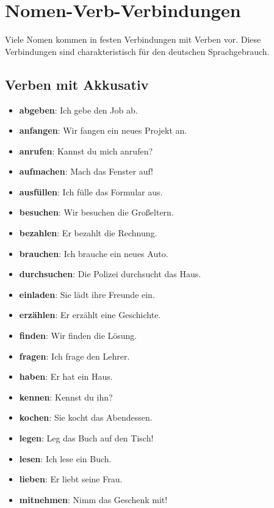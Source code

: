 \chapter{Nomen-Verb-Verbindungen}
\label{cha:NomenVerb}

Viele Nomen kommen in festen Verbindungen mit Verben vor. Diese Verbindungen sind charakteristisch für den deutschen Sprachgebrauch.

\section{Verben mit Akkusativ}
\label{sec:VerbenMitAkk}

\begin{itemize}
    \item \textbf{abgeben}: Ich gebe den Job ab.
    \item \textbf{anfangen}: Wir fangen ein neues Projekt an.
    \item \textbf{anrufen}: Kannst du mich anrufen?
    \item \textbf{aufmachen}: Mach das Fenster auf!
    \item \textbf{ausfüllen}: Ich fülle das Formular aus.
    \item \textbf{besuchen}: Wir besuchen die Großeltern.
    \item \textbf{bezahlen}: Er bezahlt die Rechnung.
    \item \textbf{brauchen}: Ich brauche ein neues Auto.
    \item \textbf{durchsuchen}: Die Polizei durchsucht das Haus.
    \item \textbf{einladen}: Sie lädt ihre Freunde ein.
    \item \textbf{erzählen}: Er erzählt eine Geschichte.
    \item \textbf{finden}: Wir finden die Lösung.
    \item \textbf{fragen}: Ich frage den Lehrer.
    \item \textbf{haben}: Er hat ein Haus.
    \item \textbf{kennen}: Kennst du ihn?
    \item \textbf{kochen}: Sie kocht das Abendessen.
    \item \textbf{legen}: Leg das Buch auf den Tisch!
    \item \textbf{lesen}: Ich lese ein Buch.
    \item \textbf{lieben}: Er liebt seine Frau.
    \item \textbf{mitnehmen}: Nimm das Geschenk mit!

\end{itemize}

